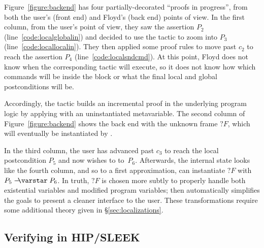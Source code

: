 Figure~\ref{figure:backend} has four partially-decorated ``proofs in progress'', from both the user's (front end) and Floyd's (back end) points of view.  In the first column, from the user's point of view, they saw the assertion $P_2$ (line~\ref{code:localglobalin}) and decided to use the  tactic to zoom into $P_3$ (line~\ref{code:locallocalin}).  They then applied some proof rules to move past $c_2$ to reach the assertion $P_4$ (line~\ref{code:localsndcmd}).  At this point, Floyd does not know when the corresponding  tactic will execute, so it does not know how which commands will be inside the block or what the final local and global postconditions will be.

Accordingly, the  tactic builds an incremental proof in the underlying program logic by applying  with an uninstantiated metavariable.
The second column of Figure~\ref{figure:backend} shows the back end with the unknown frame $?F$, which will eventually be instantiated by .

In the third column, the user has advanced past $c_3$ to reach the local postcondition $P_5$ and now wishes to  to~$P_6$.  Afterwards, the internal state looks like the fourth column, and so to a first approximation,  can instantiate $?F$ with $P_5 \wand P_6$.  In truth, $?F$ is chosen more subtly to properly handle both existential variables and modified program variables;  then automatically simplifies the goals to present a cleaner interface to the user.  These transformations require some additional theory given in \S\ref{sec:localizations}.

\subsection{Verifying  in HIP/SLEEK}
\label{sec:hipsleek} %
\label{sec:hipsleekmark}


